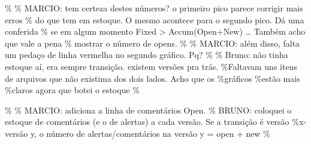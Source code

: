 \documentclass[
]{article}
\begin{document}
\% \% MARCIO: tem certeza destes números? o primeiro pico parece
corrigir mais erros \% do que tem em estoque. O mesmo acontece para o
segundo pico. Dá uma conferida \% se em algum momento Fixed
\textgreater{} Accum(Open+New) \ldots{} Também acho que vale a pena \%
mostrar o número de opens. \% \% MARCIO: além disso, falta um pedaço de
linha vermelha no segundo gráfico. Pq? \% \% Bruno: não tinha estoque
aí, era sempre transição. existem versões pra trás. \%Faltavam uns itens
de arquivos que não existima dos dois lados. Acho que os \%gráficos
\%estão mais \%claros agora que botei o estoque \%

\% \% MARCIO: adiciona a linha de comentários Open. \% BRUNO: coloquei o
estoque de comentários (e o de alertas) a cada versão. Se a transição é
versão \%x-versão y, o número de alertas/comentários na versão y = open
+ new \%

\small

\normalsize

\small
\end{document}
